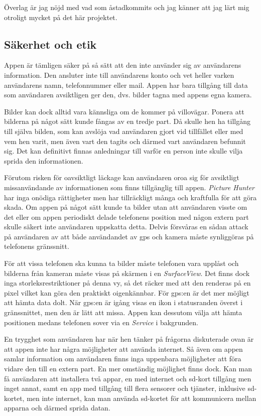 \documentclass[11px, a4paper, twocolumn]{article}
\begin{document}
	Överlag är jag nöjd med vad som åstadkommits och jag känner att jag lärt mig otroligt mycket på det här projektet.


\subsection{Säkerhet och etik}
	Appen är tämligen säker på så sätt att den inte använder sig av användarens information. Den ansluter inte till användarens konto och vet heller varken användarens namn, telefonnummer eller mail. Appen har bara tillgång till data som användaren avsiktligen ger den, dvs. bilder tagna med appens egna kamera.

	Bilder kan dock alltid vara kännsliga om de kommer på villovägar. Ponera att bilderna på något sätt kunde fångas av en tredje part. Då skulle hen ha tillgång till själva bilden, som kan avslöja vad användaren gjort vid tillfället eller med vem hen varit,  men även vart den tagits och därmed vart användaren befunnit sig. Det kan definitivt finnas anledningar till varför en person inte skulle vilja sprida den informationen.

	Förutom risken för oavsiktligt läckage kan användaren oroa sig för avsiktligt missanvändande av informationen som finns tillgänglig till appen. \emph{Picture Hunter} har inga onödiga rättigheter men har tillräckligt många och kraftfulla för att göra skada. Om appen på något sätt kunde ta bilder utan att användaren visste om det eller om appen periodiskt delade telefonens position med någon extern part skulle säkert inte användaren uppskatta detta. Delvis försvåras en sådan attack på användaren av att både användandet av gps och kamera måste synliggöras på telefonens gränssnitt.

	För att vissa telefonen ska kunna ta bilder måste telefonen vara upplåst och bilderna från kameran måste visas på skärmen i en \emph{SurfaceView}. Det finns dock inga storleksrestriktioner på denna vy, så det räcker med att den renderas på en pixel vilket kan göra den praktiskt oigenkännbar. För gps:en är det mer möjligt att hämta data dolt. När gps:en är igång visas en ikon i statusranden överst i gränssnittet, men den är lätt att missa. Appen kan dessutom välja att hämta positionen medans telefonen sover via en \emph{Service} i bakgrunden.

	En trygghet som användaren har när hen tänker på frågorna diskuterade ovan är att appen inte har några möjligheter att använda internet. Så även om appen samlar information om användaren finns inga uppenbara möjligheter att föra vidare den till en extern part. En mer omständig möjlighet finns dock. Kan man få användaren att installera två appar, en med internet och sd-kort tillgång men inget annat, samt en app med tillgång till flera sensorer och tjänster, inklusive sd-kortet, men inte internet, kan man använda sd-kortet för att kommunicera mellan apparna och därmed sprida datan.
\end{document}
